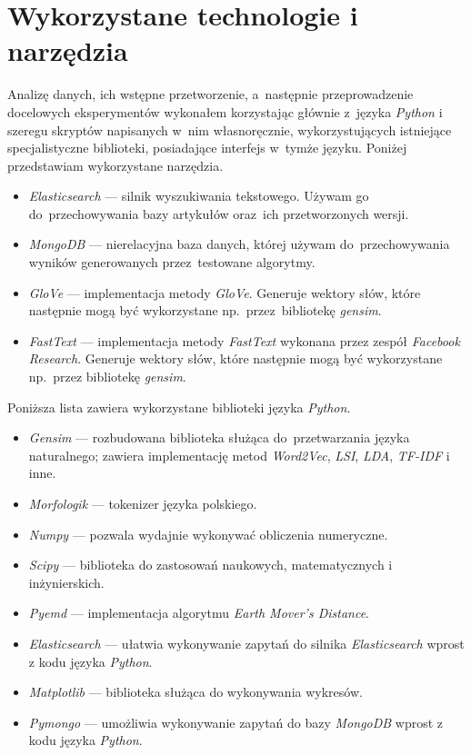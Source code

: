 \documentclass[pl]{minipw} %
\begin{document}
\newpage
\pagestyle{empty}
\appendix
\chapter{Wykorzystane technologie i narzędzia}
Analizę danych, ich wstępne przetworzenie, a~następnie przeprowadzenie docelowych eksperymentów wykonałem korzystając głównie z~języka \textit{Python} i szeregu skryptów napisanych w~nim własnoręcznie, wykorzystujących istniejące specjalistyczne biblioteki, posiadające interfejs w~tymże języku. Poniżej przedstawiam wykorzystane narzędzia.
\begin{itemize}
	\item \textit{Elasticsearch} --- silnik wyszukiwania tekstowego. Używam go do~przechowywania bazy artykułów oraz~ich przetworzonych wersji.
	\item \textit{MongoDB} --- nierelacyjna baza danych, której używam do~przechowywania wyników generowanych przez~testowane algorytmy.
	\item \textit{GloVe} --- implementacja metody \textit{GloVe}. Generuje wektory słów, które następnie mogą być wykorzystane np.~przez~bibliotekę \textit{gensim}.
	\item \textit{FastText} --- implementacja metody \textit{FastText} wykonana przez zespół \textit{Facebook Research}. Generuje wektory słów, które następnie mogą być wykorzystane np.~przez bibliotekę \textit{gensim}.
\end{itemize}

Poniższa lista zawiera wykorzystane biblioteki języka \textit{Python}.
\begin{itemize}
	\item \textit{Gensim} --- rozbudowana biblioteka służąca do~przetwarzania języka naturalnego; zawiera implementację metod \textit{Word2Vec}, \textit{LSI}, \textit{LDA}, \textit{TF-IDF} i inne.
	\item \textit{Morfologik} --- tokenizer języka polskiego.
	\item \textit{Numpy} --- pozwala wydajnie wykonywać obliczenia numeryczne.
	\item \textit{Scipy} --- biblioteka do zastosowań naukowych, matematycznych i inżynierskich.
	\item \textit{Pyemd} --- implementacja algorytmu \textit{Earth Mover's Distance}.
	\item \textit{Elasticsearch} --- ułatwia wykonywanie zapytań do silnika \textit{Elasticsearch} wprost z kodu języka \textit{Python}.
	\item \textit{Matplotlib} --- biblioteka służąca do wykonywania wykresów.
	\item \textit{Pymongo} --- umożliwia wykonywanie zapytań do bazy \textit{MongoDB} wprost z kodu języka \textit{Python}.
\end{itemize}
\end{document}
